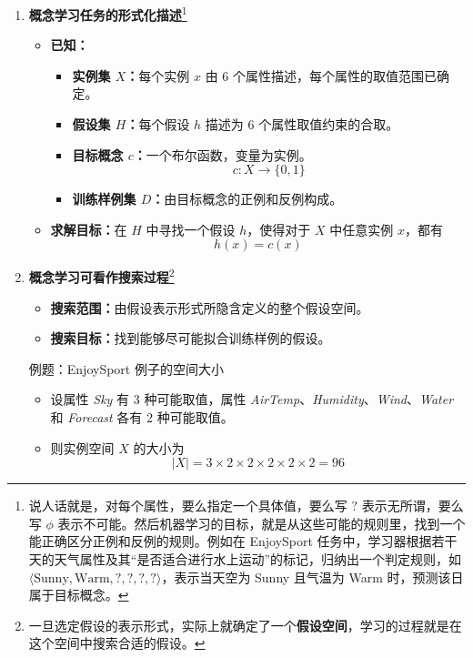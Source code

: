 \documentclass[../main.tex]{subfiles}
\begin{document}
\begin{enumerate}
        \item \textbf{概念学习任务的形式化描述}\footnote{说人话就是，对每个属性，要么指定一个具体值，要么写 $?$ 表示无所谓，要么写 $\phi$ 表示不可能。然后机器学习的目标，就是从这些可能的规则里，找到一个能正确区分正例和反例的规则。例如在 EnjoySport 任务中，学习器根据若干天的天气属性及其“是否适合进行水上运动”的标记，归纳出一个判定规则，如 $\langle \text{Sunny}, \text{Warm}, ?, ?, ?, ? \rangle$，表示当天空为 Sunny 且气温为 Warm 时，预测该日属于目标概念。}
        \begin{itemize}
            \item \textbf{已知：}
            \begin{itemize}
                \item \textbf{实例集 $X$：}每个实例 $x$ 由 6 个属性描述，每个属性的取值范围已确定。
                \item \textbf{假设集 $H$：}每个假设 $h$ 描述为 6 个属性取值约束的合取。
                \item \textbf{目标概念 $c$：}一个布尔函数，变量为实例。
                \[
                c : X \rightarrow \{0,1\}
                \]
                \item \textbf{训练样例集 $D$：}由目标概念的正例和反例构成。
            \end{itemize}
            \item \textbf{求解目标：}在 $H$ 中寻找一个假设 $h$，使得对于 $X$ 中任意实例 $x$，都有
            \[
                h(x) = c(x)
            \]
        \end{itemize}
    \item \textbf{概念学习可看作搜索过程}\footnote{一旦选定假设的表示形式，实际上就确定了一个\textbf{假设空间}，学习的过程就是在这个空间中搜索合适的假设。}
    \begin{itemize}
        \item \textbf{搜索范围：}由假设表示形式所隐含定义的整个假设空间。
        \item \textbf{搜索目标：}找到能够尽可能拟合训练样例的假设。
    \end{itemize}
    {\small\kaishu
    例题：EnjoySport 例子的空间大小\label{enjoy_sport}
    \begin{itemize}
        \item 设属性 \textit{Sky} 有 3 种可能取值，属性 \textit{AirTemp}、\textit{Humidity}、\textit{Wind}、\textit{Water} 和 \textit{Forecast} 各有 2 种可能取值。
        \item 则实例空间 $X$ 的大小为
        \[
            |X| = 3 \times 2 \times 2 \times 2 \times 2 \times 2 = 96
\]
\end{itemize}}
\end{enumerate}
\end{document}
